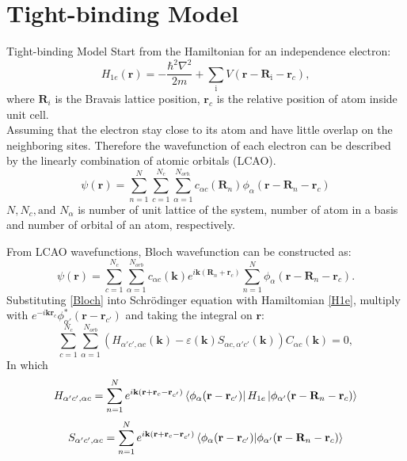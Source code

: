 \documentclass{beamer}
\begin{document}
\section{Tight-binding Model}
\begin{frame}{Tight-binding Model}
\quad Start from the Hamiltonian for an independence electron:
\begin{equation}
	\label{H1e}
	H_{1e}(\textbf{r}) = -\frac{\hbar^2 \nabla^2}{2m} + \sum_{\text{i}} V(\textbf{r} - \textbf{R}_\text{i} -\textbf{r}_c),
\end{equation}
\quad where $\textbf{R}_i$ is the Bravais lattice position, $\textbf{r}_c$ is the relative position of atom inside unit cell.\\\null\quad Assuming that the electron stay close to its atom and have little overlap on the neighboring sites. Therefore the wavefunction of each electron can be described by the linearly combination of atomic orbitals (LCAO).
\begin{equation}
	\label{key}
	\psi (\textbf{r}) = \sum_{n=1}^N \sum_{c = 1}^{N_c} \sum_{\alpha = 1}^{N_{orb.}} c_{\alpha c}(\textbf{R}_n) \phi_{\alpha}(\textbf{r}-\textbf{R}_n -\textbf{r}_c)
\end{equation}
$N, N_c, \text{and } N_{\alpha}$ is number of unit lattice of the system, number of atom in a basis and number of orbital of an atom, respectively.
\end{frame}
\begin{frame}
	From LCAO wavefunctions, Bloch wavefunction can be constructed as:
	\begin{equation}
\label{Bloch}
\psi(\textbf{r}) = \sum_{c = 1}^{N_c} \sum_{\alpha = 1}^{N_{orb}}c_{\alpha c}(\textbf{k}) e^{i\textbf{k}(\textbf{R}_n + \textbf{r}_c)} \sum_{n = 1}^N \phi_{\alpha}(\textbf{r} - \textbf{R}_n -\textbf{r}_c).
	\end{equation}
Substituting \eqref{Bloch} into Schrödinger equation with Hamiltomian \eqref{H1e}, multiply with $e^{-i\textbf{k}\textbf{r}_c} \phi^*_{\alpha'}(\textbf{r} - \textbf{r}_{c'})$ and taking the integral on $\textbf{r}$:
\begin{equation}
\label{TB full}
\sum_{c = 1}^{N_c} \sum_{\alpha = 1}^{N_{orb}}
(H_{\alpha'c',\alpha c}(\textbf{k}) -\varepsilon(\textbf{k})S_{\alpha c,\alpha'c'}(\textbf{k}))C_{\alpha c}(\textbf{k}) =0,
\end{equation}
In which
\begin{equation}
\label{H element def}
H_{\alpha' c', \alpha c} = \sum_{n = 1}^N e^{i\textbf{k}(\textbf{r} + \textbf{r}_c -\textbf{r}_{c'})} \bra{\phi_{\alpha}(\textbf{r} - \textbf{r}_{c'})}H_{1e} \ket{\phi_{\alpha'}(\textbf{r} -\textbf{R}_n -\textbf{r}_c)}
\end{equation}
\begin{equation}
	S_{\alpha' c', \alpha c} = \sum_{n = 1}^N e^{i\textbf{k}(\textbf{r} + \textbf{r}_c -\textbf{r}_{c'})} \bra{\phi_{\alpha}(\textbf{r} - \textbf{r}_{c'})} \ket{\phi_{\alpha'}(\textbf{r} -\textbf{R}_n -\textbf{r}_c)}
\end{equation}
\end{frame}
\end{document}
